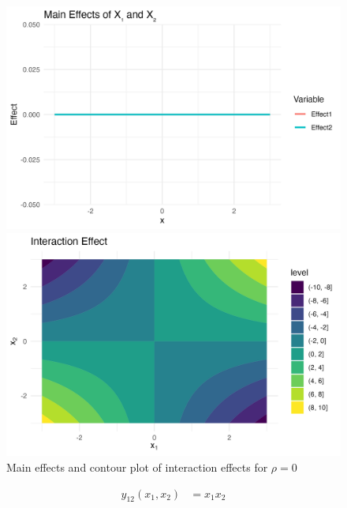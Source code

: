 \begin{figure}[htpb]
    \centering
    \begin{minipage}[t]{0.49\textwidth}
        \centering
        \includegraphics[width=\textwidth]{images/interaction_a1p00_a2p00_a11p00_a22p00_a12p10_rhop00_main.png}
    \end{minipage}%
    \hfill
    \begin{minipage}[t]{0.49\textwidth}
        \centering
        \includegraphics[width=\textwidth]{images/interaction_a1p00_a2p00_a11p00_a22p00_a12p10_rhop00_interaction.png}
    \end{minipage}
    \caption{Main effects and contour plot of interaction effects for $\rho = 0$}
    \label{fig:interaction_rho_0}
\end{figure}
\begin{align*}
y_{12}(x_1,x_2) &= x_1x_2
\end{align*}


